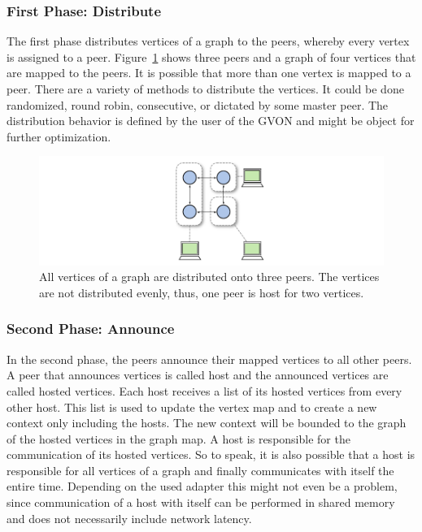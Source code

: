 \subsubsection*{First Phase: Distribute}
The first phase distributes vertices of a graph to the peers, whereby
every vertex is assigned to a peer.  Figure~\ref{fig:gvon_mapping}
shows three peers and a graph of four vertices that are mapped to the
peers. It is possible that more than one vertex is mapped to a peer.
There are a variety of methods to distribute the vertices.  It could be
done randomized, round robin, consecutive, or dictated by
some master peer. The distribution behavior is defined by the user of
the GVON and might be object for further optimization.

\begin{figure}[H]
  \centering \includegraphics[width=\textwidth]{graphics/30_gvon_mapping}
  \caption{All vertices of a graph are distributed onto three
    peers. The vertices are not distributed evenly, thus, one peer is
    host for two vertices.}
  \label{fig:gvon_mapping}
\end{figure}

\subsubsection*{Second Phase: Announce}
In the second phase, the peers announce their mapped vertices to all
other peers.  A peer that announces vertices is called host and the
announced vertices are called hosted vertices.  Each host receives a
list of its hosted vertices from every other host.  This list is used
to update the vertex map and to create a new context only including
the hosts. The new context will be bounded to the graph of the hosted
vertices in the graph map.  A host is responsible for the
communication of its hosted vertices.  So to speak, it is also
possible that a host is responsible for all vertices of a graph and
finally communicates with itself the entire time.  Depending on the
used adapter this might not even be a problem, since communication of
a host with itself can be performed in shared memory and does not
necessarily include network latency.


